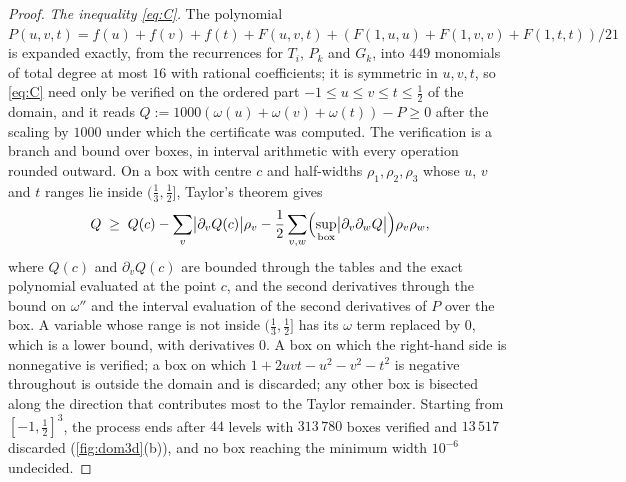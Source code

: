 \documentclass[11pt,reqno]{amsart}
\renewcommand{\_}{\origunderscore\allowbreak}
\numberwithin{equation}{section}
\theoremstyle{plain}
\theoremstyle{definition}
\theoremstyle{remark}
\begin{document}
\begin{proof}
\emph{The inequality \eqref{eq:C}.} The polynomial
$P(u,v,t)=f(u)+f(v)+f(t)+F(u,v,t)+(F(1,u,u)+F(1,v,v)+F(1,t,t))/21$ is
expanded exactly, from the recurrences for $T_i$, $P_k$ and $G_k$, into
$449$ monomials of total degree at most $16$ with rational coefficients;
it is symmetric in $u,v,t$, so \eqref{eq:C} need only be verified on
the ordered part $-1\le u\le v\le t\le\tfrac12$ of the domain, and it
reads $Q:=1000(\omega(u)+\omega(v)+\omega(t))-P\ge0$ after the scaling
by $1000$ under which the certificate was computed. The verification is
a branch and bound over boxes, in interval arithmetic with every
operation rounded outward. On a box with centre $c$ and
half-widths $\rho_1,\rho_2,\rho_3$ whose $u$, $v$ and $t$ ranges lie
inside $(\tfrac13,\tfrac12]$, Taylor's theorem gives
\[
  Q\;\ge\;Q(c)-\sum_v\bigl|\partial_vQ(c)\bigr|\rho_v
  -\frac12\sum_{v,w}\Bigl(\sup_{\rm box}\bigl|\partial_v\partial_wQ\bigr|\Bigr)\rho_v\rho_w ,
\]
where $Q(c)$ and $\partial_vQ(c)$ are bounded through the tables and the
exact polynomial evaluated at the point $c$, and the second derivatives
through the bound on $\omega''$ and the interval evaluation of the
second derivatives of $P$ over the box. A variable whose range is not
inside $(\tfrac13,\tfrac12]$ has its $\omega$ term replaced by $0$, which
is a lower bound, with derivatives $0$. A box on which the right-hand
side is nonnegative is verified; a box on which $1+2uvt-u^2-v^2-t^2$ is
negative throughout is outside the domain and is discarded; any other
box is bisected along the direction that contributes most to the
Taylor remainder. Starting from $[-1,\tfrac12]^3$, the process ends
after $44$ levels with $313\,780$ boxes verified and $13\,517$
discarded (\cref{fig:dom3d}(b)), and no box reaching the minimum width
$10^{-6}$ undecided.


\end{proof}
\end{document}
